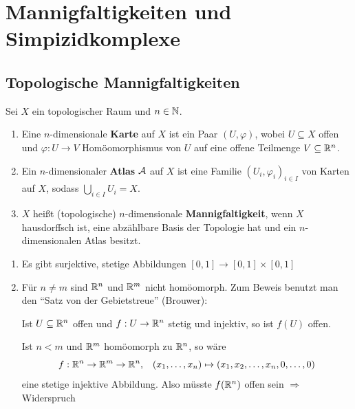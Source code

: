 \chapter{Mannigfaltigkeiten und Simpizidkomplexe}
\section{Topologische Mannigfaltigkeiten}
\begin{definition}
    Sei $X$ ein topologischer Raum und $n \in \mathbb{N}$.
    \begin{enumerate}[label=\alph*)]
        \item Eine $n$-dimensionale \textbf{Karte} auf
              $X$ ist ein Paar $(U, \varphi)$, wobei $U \subseteq X$
              offen und $\varphi: U \rightarrow V$ Homöomorphismus
              von $U$ auf eine offene Teilmenge $V \subseteq \mathbb{R}^n$.
        \item Ein $n$-dimensionaler \textbf{Atlas} $\mathcal{A}$ auf $X$ ist eine
              Familie $(U_i, \varphi_i)_{i \in I}$ von Karten auf $X$,
              sodass $\bigcup_{i \in I} U_i = X$.
        \item $X$ heißt (topologische) $n$-dimensionale \textbf{Mannigfaltigkeit},
              wenn $X$ hausdorffsch ist, eine abzählbare Basis der 
              Topologie hat und ein $n$-dimensionalen Atlas besitzt.
    \end{enumerate}
\end{definition}

\begin{bemerkung}
    \begin{enumerate}[label=(\alph*)]
        \item Es gibt surjektive, stetige Abbildungen $[0,1] \rightarrow [0,1] \times [0,1]$
        \item Für $n \neq m$ sind $\mathbb{R}^n$ und $\mathbb{R}^m$ nicht homöomorph.
              Zum Beweis benutzt man den \enquote{Satz von der Gebietstreue} (Brouwer):

              Ist $U \subseteq \mathbb{R}^n$ offen und $f: U \rightarrow \mathbb{R}^n$
              stetig und injektiv, so ist $f(U)$ offen.

              Ist $n < m$ und $\mathbb{R}^m$ homöomorph zu $\mathbb{R}^n$, so wäre
              \[f:\mathbb{R}^n \rightarrow \mathbb{R}^m \rightarrow \mathbb{R}^n, \;\;\; (x_1, \dots, x_n) \mapsto (x_1, x_2, \dots, x_n, 0, \dots, 0)\]
              eine stetige injektive Abbildung. Also müsste $f(\mathbb{R}^n)$
              offen sein $\Rightarrow$ Widerspruch
    \end{enumerate}
\end{bemerkung}

